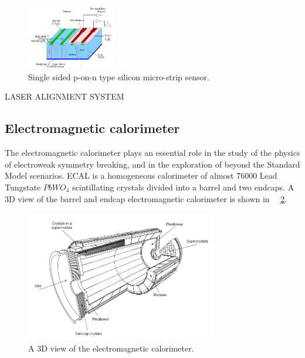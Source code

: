 \begin{figure}[htbp]
\centering
\includegraphics[width=0.35\textwidth]{Images/Silicon_structure}
\caption{Single sided p-on-n type silicon micro-strip sensor.}
\label{Silicon_structure}
\end{figure}

LASER ALIGNMENT SYSTEM

\subsection{Electromagnetic calorimeter}
The electromagnetic calorimeter plays an essential role in the study of the physics of electroweak symmetry breaking, and  in the exploration of  beyond the Standard Model scenarios.  ECAL is a homogeneous calorimeter of almost 76000 Lead Tungstate $PbWO_4$ scintillating crystals divided into a barrel and two endcaps.
A $3$D view of the barrel and endcap electromagnetic calorimeter is shown in \figurename~~\ref{ECAL_3D}.
\begin{figure}[h!]
 \centering
 \includegraphics[width=0.75\textwidth]{Images/ECAL_3D}
 \caption{A $3$D view of the electromagnetic calorimeter.}
\label{ECAL_3D}
\end{figure}


